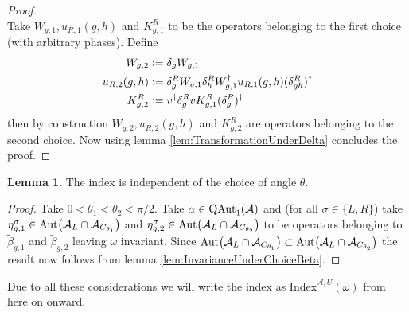 \documentclass[12pt,a4paper,twoside]{article}
\newcommand{\defeq}{\vcentcolon=}
\let\originalleft\left
\let\originalright\right
\renewcommand{\left}{\mathopen{}\mathclose\bgroup\originalleft}
\renewcommand{\right}{\aftergroup\egroup\originalright}
\renewcommand{\AA}{\mathcal A}
\newcommand{\Aut}[1]{\textrm{Aut}\left(#1\right)}
\newcommand{\QAut}[1]{\textrm{QAut}_1\left(#1\right)}
\theoremstyle{definition}
\newtheorem{lemma}[theorem]{Lemma}
\numberwithin{equation}{section}
\begin{document}
\begin{proof}
\begin{equation}
	\end{equation}
	Take $W_{g,1},u_{R,1}(g,h)$ and $K^R_{g,1}$ to be the operators belonging to the first choice (with arbitrary phases). Define
	\begin{align}
		W_{g,2}&\defeq\delta_g W_{g,1}\\
		u_{R,2}(g,h)&\defeq \delta_g^R W_{g,1}\delta_h^R W_{g,1}^\dagger u_{R,1}(g,h)(\delta_{gh}^R)^\dagger\\
		K^R_{g,2}&\defeq v^\dagger \delta_g^R v K_{g,1}^R (\delta_g^R)^\dagger
	\end{align}
	then by construction $W_{g,2},u_{R,2}(g,h)$ and $K^R_{g,2}$ are operators belonging to the second choice. Now using lemma \ref{lem:TransformationUnderDelta} concludes the proof.
\end{proof}
\begin{lemma}
	The index is independent of the choice of angle $\theta$.
\end{lemma}
\begin{proof}
	Take $0<\theta_1<\theta_2<\pi/2$. Take $\alpha\in \QAut{\AA}$ and (for all $\sigma\in\{L,R\}$) take $\eta_{g,1}^\sigma\in\Aut{\AA_L\cap\AA_{C_{\theta_1}}}$ and $\eta_{g,2}^\sigma\in\Aut{\AA_L\cap\AA_{C_{\theta_2}}}$ to be operators belonging to $\tilde{\beta}_{g,1}$ and $\tilde{\beta}_{g,2}$ leaving $\omega$ invariant. Since $\Aut{\AA_L\cap\AA_{C_{\theta_1}}}\subset \Aut{\AA_L\cap\AA_{C_{\theta_2}}}$ the result now follows from lemma \ref{lem:InvarianceUnderChoiceBeta}.
\end{proof}
Due to all these considerations we will write the index as $\textrm{Index}^{\AA,U}(\omega)$ from here on onward.
\end{document}
